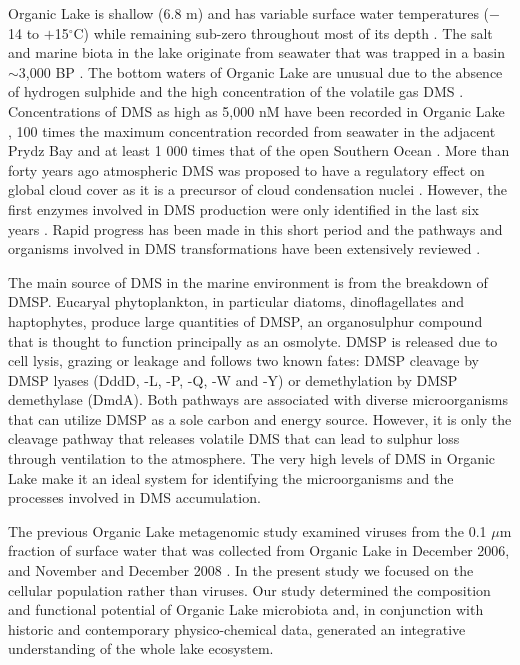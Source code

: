 Organic Lake is shallow (6.8 m) and has variable surface water temperatures ($-$14 to $+$15$^{\circ}$C) while remaining sub-zero throughout most of its depth \cite{Franzmann1987b, Gibson1991, Roberts1993b, Gibson1999}.
The salt and marine biota in the lake originate from seawater that was trapped in a basin $\sim$3,000 BP \cite{Zwartz1998, Bird1991}. 
The bottom waters of Organic Lake are unusual due to the absence of hydrogen sulphide and the high concentration of the volatile gas \ac{DMS} \cite{Deprez1986, Franzmann1987b, Gibson1991, Roberts1993a, Roberts1993b}. 
Concentrations of \ac{DMS} as high as 5,000 nM have been recorded in Organic Lake \cite{Gibson1991}, 100 times the maximum concentration recorded from seawater in the adjacent Prydz Bay and at least 1 000 times that of the open Southern Ocean \cite{Curran1998}.
More than forty years ago atmospheric \ac{DMS} was proposed to have a regulatory effect on global cloud cover as it is a precursor of cloud condensation nuclei \cite{Lovelock1972, Charlson1987}.
However, the first enzymes involved in \ac{DMS} production were only identified in the last six years \cite{Todd2007}.
Rapid progress has been made in this short period and the pathways and organisms involved in \ac{DMS} transformations have been extensively reviewed \cite{Johnston2008, Schafer2010, Curson2011b, Reisch2011b, Moran2012}. 

The main source of \ac{DMS} in the marine environment is from the breakdown of \ac{DMSP}. 
Eucaryal phytoplankton, in particular diatoms, dinoflagellates and haptophytes, produce large quantities of \ac{DMSP}, an organosulphur compound that is thought to function principally as an osmolyte. 
\ac{DMSP} is released due to cell lysis, grazing or leakage and follows two known fates: \ac{DMSP} cleavage by \ac{DMSP} lyases (DddD, -L, -P, -Q, -W and -Y) or demethylation by \ac{DMSP} demethylase (DmdA).
 Both pathways are associated with diverse microorganisms that can utilize \ac{DMSP} as a sole carbon and energy source. 
However, it is only the cleavage pathway that releases volatile \ac{DMS} that can lead to sulphur loss through ventilation to the atmosphere.
The very high levels of \ac{DMS} in Organic Lake make it an ideal system for identifying the microorganisms and the processes involved in \ac{DMS} accumulation. 

The previous Organic Lake metagenomic study examined viruses from the 0.1 $\mu$m fraction of surface water that was collected from Organic Lake in December 2006, and November and December 2008 \cite{Yau2011}. 
In the present study we focused on the cellular population rather than viruses. 
Our study determined the composition and functional potential of Organic Lake microbiota and, in conjunction with historic and contemporary physico-chemical data, generated an integrative understanding of the whole lake ecosystem. 

